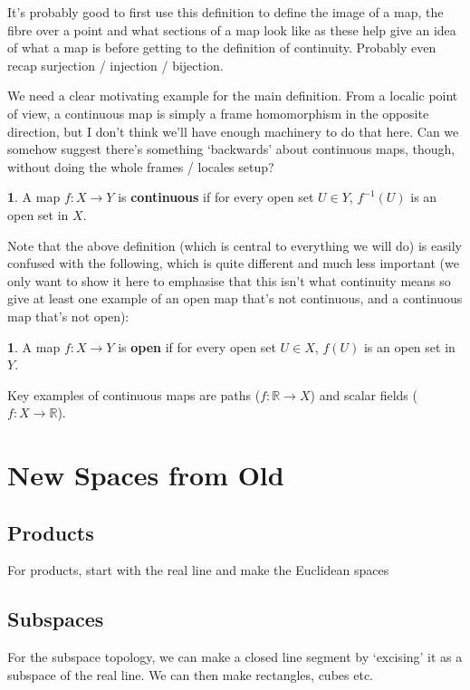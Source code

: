 \documentclass[oneside,english]{amsbook}
\numberwithin{section}{chapter}
\theoremstyle{plain}
\theoremstyle{definition}
\newtheorem{defn}[thm]{\protect\definitionname}
\providecommand{\definitionname}{Definition}
\begin{document}
It's probably good to first use this definition to define the image of a map, the fibre over a point and what sections of a map look like as these help give an idea of what a map is before getting to the definition of continuity. Probably even recap surjection / injection / bijection.

We need a clear motivating example for the main definition. From a localic point of view, a continuous map is simply a frame homomorphism in the opposite direction, but I don't think we'll have enough machinery to do that here. Can we somehow suggest there's something `backwards' about continuous maps, though, without doing the whole frames / locales setup?

\begin{defn} 
	A map $f:X\to Y$ is \textbf{continuous} if for every open set $U\in Y$, $f^{-1}(U)$ is an open set in $X$.
\end{defn} 

Note that the above definition (which is central to everything we will do) is easily confused with the following, which is quite different and much less important (we only want to show it here to emphasise that this isn't what continuity means so give at least one example of an open map that's not continuous, and a continuous map that's not open):

\begin{defn} 
	A map $f:X\to Y$ is \textbf{open} if for every open set $U\in X$, $f(U)$ is an open set in $Y$.
\end{defn} 

Key examples of continuous maps are paths ($f:\mathbb{R}\to X$) and scalar fields ($f:X\to \mathbb{R}$).

\chapter{New Spaces from Old}

\section{Products}

For products, start with the real line and make the Euclidean spaces

\section{Subspaces}

For the subspace topology, we can make a closed line segment by `excising' it as a subspace of the real line. We can then make rectangles, cubes etc.
\end{document}
